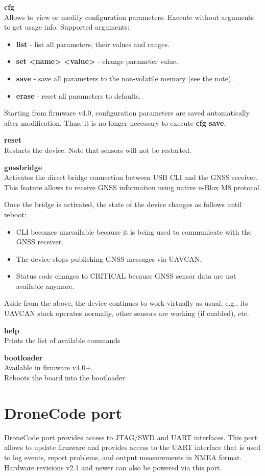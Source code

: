 \documentclass{zubaxdoc}
\begin{document}
\textbf{cfg}\\
Allows to view or modify configuration parameters.
Execute without arguments to get usage info. Supported arguments:
\begin{itemize}
\item \textbf{list} - list all parameters, their values and ranges.
\item \textbf{set <name> <value>} - change parameter value.
\item \textbf{save} - save all parameters to the non-volatile memory (see the note).
\item \textbf{erase} - reset all parameters to defaults.
\end{itemize}

Starting from firmware v4.0, configuration parameters are saved automatically after modification. Thus, it is no longer necessary to execute \textbf{cfg save}.

\textbf{reset}\\
Restarts the device. Note that sensors will not be restarted.

\textbf{gnssbridge}\\
Activates the direct bridge connection between USB CLI and the GNSS receiver. This feature allows to receive GNSS information using native u-Blox M8 protocol.

Once the bridge is activated, the state of the device changes as follows until reboot:
\begin{itemize}
\item CLI becomes unavailable because it is being used to communicate with the GNSS receiver.
\item The device stops publishing GNSS messages via UAVCAN.
\item Status code changes to CRITICAL because GNSS sensor data are not available anymore.
\end{itemize}

Aside from the above, the device continues to work virtually as usual, e.g., its UAVCAN stack operates normally, other sensors are working (if enabled), etc.

\textbf{help}\\
Prints the list of available commands

\textbf{bootloader}\\
Available in firmware v4.0+.\\
Reboots the board into the bootloader.

\chapter{DroneCode port}
DroneCode port provides access to JTAG/SWD and UART interfaces. This port allows to update firmware and provides access to the UART interface that is used to log events, report problems, and output measurements in NMEA format. Hardware revisions v2.1 and newer can also be powered via this port.
\end{document}
